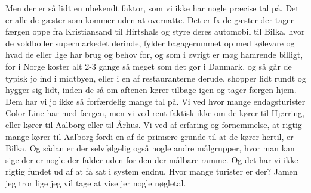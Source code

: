 Men der er så lidt en ubekendt faktor, som vi ikke har nogle præcise tal på. Det er alle de gæster som kommer uden at overnatte. Det er fx de gæster der tager færgen oppe fra Kristiansand til Hirtshals og styre deres automobil til Bilka, hvor de voldboller supermarkedet derinde, fylder bagagerummet op med kølevare og hvad de eller lige har brug og behov for, og som i øvrigt er møg hamrende billigt, for i Norge koster alt 2-3 gange så meget som det gør i Danmark, og så går de typisk jo ind i midtbyen, eller i en af restauranterne derude, shopper lidt rundt og hygger sig lidt, inden de så om aftenen kører tilbage igen og tager færgen hjem. Dem har vi jo ikke så forfærdelig mange tal på. Vi ved hvor mange endagsturister Color Line har med færgen, men vi ved rent faktisk ikke om de kører til Hjørring, eller kører til Aalborg eller til Århus. Vi ved af erfaring og fornemmelse, at rigtig mange kører til Aalborg fordi en af de primære grunde til at de kører hertil, er Bilka. Og sådan er der selvfølgelig også nogle andre målgrupper, hvor man kan sige der er nogle der falder uden for den der målbare ramme. Og det har vi ikke rigtig fundet ud af at få sat i system endnu. Hvor mange turister er der? Jamen jeg tror lige jeg vil tage at vise jer nogle nøgletal. \newline
